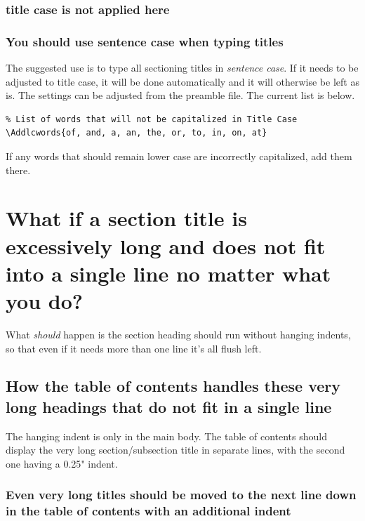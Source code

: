 \subsubsection{title case is not applied here}
\subsubsection{You should use sentence case when typing titles}

The suggested use is to type all sectioning titles in {\em sentence case}. If it needs to be adjusted to title case, it will be done automatically and it will otherwise be left as is. The settings can be adjusted from the preamble file. The current list is below.
\begin{lstlisting}
% List of words that will not be capitalized in Title Case
\Addlcwords{of, and, a, an, the, or, to, in, on, at}
\end{lstlisting}
If any words that should remain lower case are incorrectly capitalized, add them there.

\section{What if a section title is excessively long and does not fit into a single line no matter what you do?}
What \textit{should} happen is the section heading should run without hanging indents, so that even if it needs more than one line it's all flush left.
\subsection{How the table of contents handles these very long headings that do not fit in a single line}
The hanging indent is only in the main body. The table of contents should display the very long section/subsection title in separate lines, with the second one having a 0.25" indent. 
\subsubsection{Even very long titles should be moved to the next line down in the table of contents with an additional indent}

